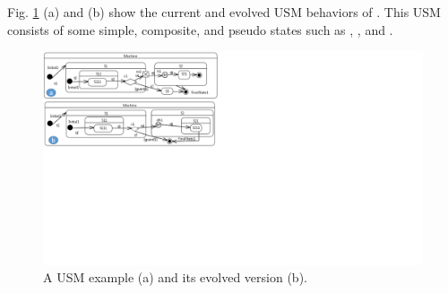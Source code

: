 Fig. \ref{fig:illustration} (a) and (b) show the current and evolved USM behaviors of .
This USM consists of some simple, composite, and pseudo states such as , , and .

\begin{figure}
	\centering
	\includegraphics[clip, trim=0cm 10.6cm 18.3cm 0.15cm, width=1.0\columnwidth]{figures/illustration}
	\caption{A USM example (a) and its evolved version (b).} 
	\label{fig:illustration}
\end{figure}

